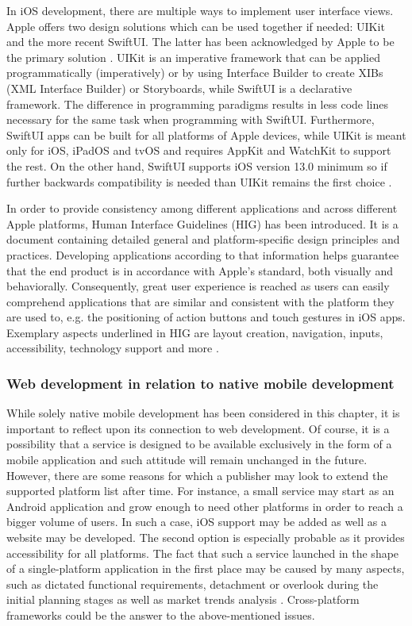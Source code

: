 In iOS development, there are multiple ways to implement user interface views. Apple offers two design solutions which can be used together if needed: UIKit and the more recent SwiftUI. The latter has been acknowledged by Apple to be the primary solution \cite{comparison_technologies_multiplatform}. UIKit is an imperative framework that can be applied programmatically (imperatively) or by using Interface Builder to create XIBs (XML Interface Builder) or Storyboards, while SwiftUI is a declarative framework. The difference in programming paradigms results in less code lines necessary for the same task when programming with SwiftUI. Furthermore, SwiftUI apps can be built for all platforms of Apple devices, while UIKit is meant only for iOS, iPadOS and tvOS and requires AppKit and WatchKit to support the rest. On the other hand, SwiftUI supports iOS version 13.0 minimum so if further backwards compatibility is needed than UIKit remains the first choice \cite{swiftui_overview,xib_why_use,swiftui_uikit}.

In order to provide consistency among different applications and across different Apple platforms, Human Interface Guidelines (HIG) has been introduced. It is a document containing detailed general and platform-specific design principles and practices. Developing applications according to that information helps guarantee that the end product is in accordance with Apple's standard, both visually and behaviorally. Consequently, great user experience is reached as users can easily comprehend applications that are similar and consistent with the platform they are used to, e.g. the positioning of action buttons and touch gestures in iOS apps. Exemplary aspects underlined in HIG are layout creation, navigation, inputs, accessibility, technology support and more \cite{hig_overview}.

\subsubsection{Web development in relation to native mobile development}

While solely native mobile development has been considered in this chapter, it is important to reflect upon its connection to web development. Of course, it is a possibility that a service is designed to be available exclusively in the form of a mobile application and such attitude will remain unchanged in the future. However, there are some reasons for which a publisher may look to extend the supported platform list after time. For instance, a small service may start as an Android application and grow enough to need other platforms in order to reach a bigger volume of users. In such a case, iOS support may be added as well as a website may be developed. The second option is especially probable as it provides accessibility for all platforms. The fact that such a service launched in the shape of a single-platform application in the first place may be caused by many aspects, such as dictated functional requirements, detachment or overlook during the initial planning stages as well as market trends analysis \cite{web_mobile_app}. Cross-platform frameworks could be the answer to the above-mentioned issues.
